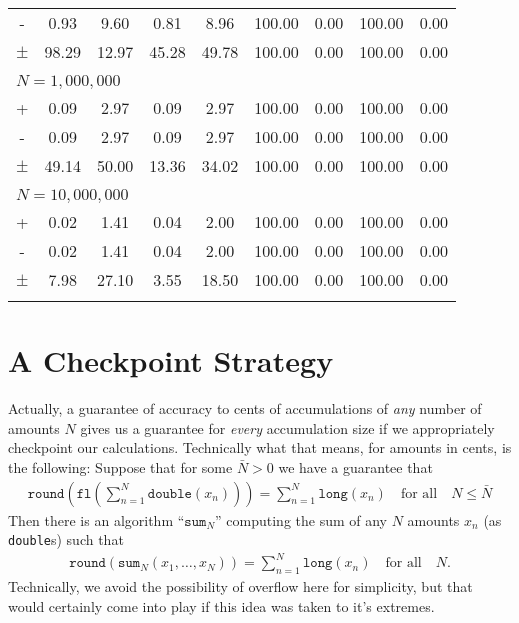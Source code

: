 \documentclass[11pt, oneside]{amsart}   	%
\begin{document}
\begin{table}[ht]
\begin{center}
\begin{tabular}{ c c c c c c c c c }
- & 0.93 & 9.60 & 0.81 & 8.96 & 100.00 & 0.00 & 100.00 & 0.00 \\
$\pm$ & 98.29 & 12.97 & 45.28 & 49.78 & 100.00 & 0.00 & 100.00 & 0.00 \\
\\ \multicolumn{9}{l}{$N = 1,000,000$} \\ \hline
+ & 0.09 & 2.97 & 0.09 & 2.97 & 100.00 & 0.00 & 100.00 & 0.00 \\
- & 0.09 & 2.97 & 0.09 & 2.97 & 100.00 & 0.00 & 100.00 & 0.00 \\
$\pm$ & 49.14 & 50.00 & 13.36 & 34.02 & 100.00 & 0.00 & 100.00 & 0.00 \\
\\ \multicolumn{9}{l}{$N = 10,000,000$} \\ \hline
+ 		& 0.02 & 1.41 	& 0.04 & 2.00 	& 100.00 & 0.00 & 100.00 & 0.00 \\
- 		& 0.02 & 1.41 	& 0.04 & 2.00 	& 100.00 & 0.00 & 100.00 & 0.00 \\
$\pm$ 	& 7.98 & 27.10 & 3.55 & 18.50 & 100.00 & 0.00 & 100.00 & 0.00 \\
\\ \hline
\end{tabular}
\end{center}
\end{table}

\section{A Checkpoint Strategy}

Actually, a guarantee of accuracy to cents of accumulations of {\em any} number of amounts $N$ gives us a guarantee for {\em every} accumulation size if we appropriately checkpoint our calculations. Technically what that means, for amounts in cents, is the following: Suppose that for some $\bar{N} > 0$ we have a guarantee that 
\begin{align*}
	\texttt{round}\left( \texttt{fl}\left( \sum_{n=1}^N \texttt{double}(x_n) \right) \right) =  \sum_{n=1}^N \texttt{long}(x_n)
	\quad\text{for all}\quad N \leq \bar{N}
\end{align*}
Then there is an algorithm ``$\texttt{sum}_N$'' computing the sum of any $N$ amounts $x_n$ (as \texttt{double}s) such that 
\begin{align*}
	\texttt{round}\left( \texttt{sum}_N\left( x_1,\dotsc,x_N \right) \right) =  \sum_{n=1}^N \texttt{long}(x_n)
	\quad\text{for all}\quad N. 
\end{align*}
Technically, we avoid the possibility of overflow here for simplicity, but that would certainly come into play if this idea was taken to it's extremes. 
\end{document}

